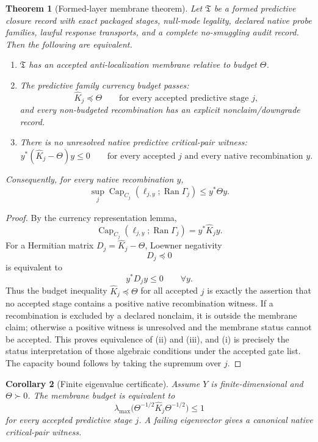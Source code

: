 \documentclass[11pt]{article}
\newtheorem{theorem}{Theorem}[section]
\newtheorem{corollary}[theorem]{Corollary}
\newcommand{\Range}{\operatorname{Ran}}
\newcommand{\Capacity}{\operatorname{Cap}}
\begin{document}
\begin{theorem}[Formed-layer membrane theorem]
Let $\mathfrak T$ be a formed predictive closure record with exact packaged stages, null-mode legality, declared native probe families, lawful response transports, and a complete no-smuggling audit record.  Then the following are equivalent.
\begin{enumerate}[label=(\roman*)]
\item $\mathfrak T$ has an accepted anti-localization membrane relative to budget $\Theta$.
\item The predictive family currency budget passes:
\[
  \widehat K_j\preceq\Theta
  \qquad\text{for every accepted predictive stage }j,
\]
and every non-budgeted recombination has an explicit nonclaim/downgrade record.
\item There is no unresolved native predictive critical-pair witness:
\[
  y^*(\widehat K_j-\Theta)y\le0
  \qquad\text{for every accepted }j\text{ and every native recombination }y.
\]
\end{enumerate}
Consequently, for every native recombination $y$,
\[
  \sup_j \Capacity_{C_j}(\ell_{j,y};\Range\Gamma_j)
  \le y^*\Theta y.
\]
\end{theorem}

\begin{proof}
By the currency representation lemma,
\[
  \Capacity_{C_j}(\ell_{j,y};\Range\Gamma_j)=y^*\widehat K_jy.
\]
For a Hermitian matrix $D_j=\widehat K_j-\Theta$, Loewner negativity
\[
  D_j\preceq0
\]
is equivalent to
\[
  y^*D_jy\le0\qquad\forall y.
\]
Thus the budget inequality $\widehat K_j\preceq\Theta$ for all accepted $j$ is exactly the assertion that no accepted stage contains a positive native recombination witness.  If a recombination is excluded by a declared nonclaim, it is outside the membrane claim; otherwise a positive witness is unresolved and the membrane status cannot be accepted.  This proves equivalence of (ii) and (iii), and (i) is precisely the status interpretation of those algebraic conditions under the accepted gate list.  The capacity bound follows by taking the supremum over $j$.
\end{proof}

\begin{corollary}[Finite eigenvalue certificate]
Assume $Y$ is finite-dimensional and $\Theta\succ0$.  The membrane budget is equivalent to
\[
  \lambda_{\max}\bigl(\Theta^{-1/2}\widehat K_j\Theta^{-1/2}\bigr)\le1
\]
for every accepted predictive stage $j$.  A failing eigenvector gives a canonical native critical-pair witness.
\end{corollary}
\end{document}

